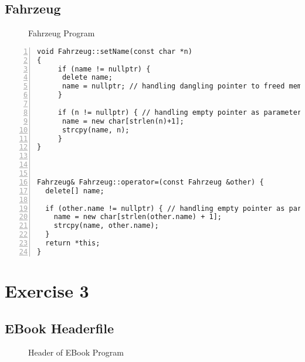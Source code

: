 \documentclass{article}
\begin{document}
\subsection{Fahrzeug }
\begin{figure}
  \scriptsize{\caption{Fahrzeug Program}}
\end{figure}
\begin{lstlisting}[basicstyle=\footnotesize\ttfamily, numbers=left, stepnumber=1, numberstyle = \normalsize, caption={My Caption}]
void Fahrzeug::setName(const char *n)
{
     if (name != nullptr) {
      delete name;
      name = nullptr; // handling dangling pointer to freed memory
     }

     if (n != nullptr) { // handling empty pointer as parameter, preventing strlen from crashing
      name = new char[strlen(n)+1];
      strcpy(name, n);
     }
}



Fahrzeug& Fahrzeug::operator=(const Fahrzeug &other) {
  delete[] name;

  if (other.name != nullptr) { // handling empty pointer as parameter, preventing strlen from crashing
    name = new char[strlen(other.name) + 1];
    strcpy(name, other.name);
  }
  return *this;
}

\end{lstlisting}

\newpage
\section{Exercise 3}
\subsection{EBook Headerfile}
\begin{figure}
  \scriptsize{\caption{Header of EBook Program}}
\end{figure}
\end{document}
